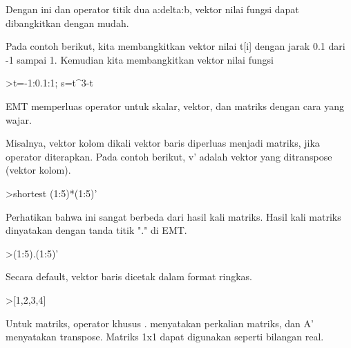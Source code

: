 \documentclass[a4paper,10pt]{article}
\begin{document}
\begin{eulernotebook}
\begin{euleroutput}
  Dengan ini dan operator titik dua a:delta:b, vektor nilai fungsi dapat dibangkitkan dengan mudah.
  
  Pada contoh berikut, kita membangkitkan vektor nilai t[i] dengan jarak 0.1 dari -1 sampai 1. Kemudian kita membangkitkan vektor nilai fungsi
  
\end{euleroutput}
\begin{euleroutput}
  
\end{euleroutput}
\begin{eulerprompt}
>t=-1:0.1:1; s=t^3-t
\end{eulerprompt}
\begin{euleroutput}
  
  EMT memperluas operator untuk skalar, vektor, dan matriks dengan cara yang wajar.
  
  Misalnya, vektor kolom dikali vektor baris diperluas menjadi matriks, jika operator diterapkan. Pada contoh berikut, v' adalah vektor yang ditranspose (vektor kolom).
  
\end{euleroutput}
\begin{eulerprompt}
>shortest (1:5)*(1:5)'
\end{eulerprompt}
\begin{euleroutput}
  
  Perhatikan bahwa ini sangat berbeda dari hasil kali matriks. Hasil kali matriks dinyatakan dengan tanda titik "." di EMT.
  
\end{euleroutput}
\begin{eulerprompt}
>(1:5).(1:5)'
\end{eulerprompt}
\begin{euleroutput}
  
  Secara default, vektor baris dicetak dalam format ringkas.
  
\end{euleroutput}
\begin{eulerprompt}
>[1,2,3,4]
\end{eulerprompt}
\begin{euleroutput}
  
  Untuk matriks, operator khusus . menyatakan perkalian matriks, dan A' menyatakan transpose. Matriks 1x1 dapat digunakan seperti bilangan real.
  

\end{euleroutput}
\end{eulernotebook}
\end{document}
